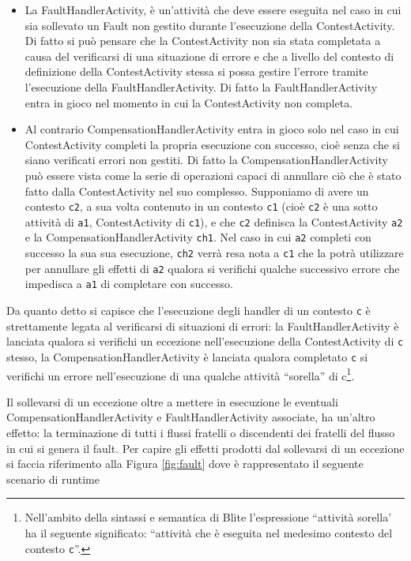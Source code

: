 \begin{itemize}
  \item La FaultHandlerActivity, \`e un'attività che deve essere eseguita nel
  caso in cui sia sollevato un Fault non gestito 
  durante l'esecuzione della ContestActivity. Di fatto si può pensare che la
  ContestActivity non sia stata completata a causa del verificarsi di una 
  situazione di errore e che a livello del contesto di definizione della 
  ContestActivity stessa si possa gestire l'errore tramite l'esecuzione della 
  FaultHandlerActivity. Di fatto la FaultHandlerActivity entra in gioco nel
  momento in cui la ContestActivity non completa.
  
  \item Al contrario CompensationHandlerActivity entra in gioco solo nel caso
  in cui ContestActivity completi la propria esecuzione con successo, cioè
  senza che si siano verificati errori non gestiti. Di fatto la
  CompensationHandlerActivity può essere vista come la serie di operazioni
  capaci di annullare ciò che \`e stato fatto dalla ContestActivity nel suo
  complesso. 
  Supponiamo di avere un contesto \texttt{c2}, a sua volta
  contenuto in un contesto \texttt{c1} (cioè \texttt{c2} \`e una sotto
  attività di \texttt{a1}, ContestActivity di \texttt{c1}), e che
  \texttt{c2} definisca la ContestActivity \texttt{a2} e la CompensationHandlerActivity
  \texttt{ch1}. Nel caso in cui \texttt{a2} completi con successo la sua
  sua esecuzione, \texttt{ch2} verrà resa nota a \texttt{c1} che la potrà
  utilizzare per annullare gli effetti di \texttt{a2} qualora si verifichi
  qualche successivo errore che impedisca a \texttt{a1} di completare con
  successo.
   
\end{itemize}

Da quanto detto si capisce che l'esecuzione degli handler di un contesto
\texttt{c} \`e strettamente legata al verificarsi di situazioni di errori:
la FaultHandlerActivity \`e lanciata qualora si verifichi un eccezione
nell'esecuzione della ContestActivity di \texttt{c} stesso, la
CompensationHandlerActivity \`e lanciata qualora completato \texttt{c} si
verifichi un errore nell'esecuzione di una qualche attività ``sorella'' di
c\footnote{Nell'ambito della sintassi e semantica di Blite l'espressione
``attività sorella' ha il seguente significato: ``attività che \`e eseguita
nel medesimo contesto del contesto \texttt{c}''.}.

Il sollevarsi di un eccezione oltre a mettere in esecuzione le eventuali
CompensationHandlerActivity e FaultHandlerActivity associate, ha un'altro
effetto: la terminazione di tutti i flussi fratelli o discendenti dei fratelli
del flusso in cui si genera il fault. Per capire gli effetti prodotti dal
sollevarsi di un eccezione si faccia riferimento alla Figura \ref{fig:fault}
dove \`e rappresentato il seguente scenario di runtime

